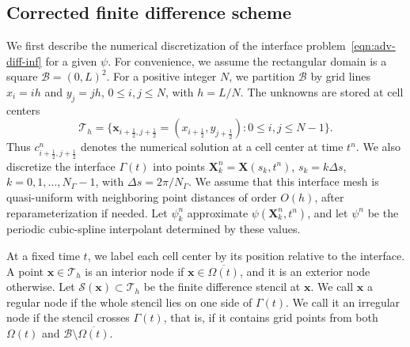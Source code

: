 \documentclass[11pt,reqno]{amsart}
\theoremstyle{plain}
\theoremstyle{definition}
\numberwithin{equation}{section}
\newcommand{\mc}[1]{\mathcal{#1}}
\newcommand{\bm}[1]{\boldsymbol{#1}}
\begin{document}
\subsection{Corrected finite difference scheme}
We first describe the numerical discretization of the interface problem~\eqref{eqn:adv-diff-inf} for a given $\psi$.
For convenience, we assume the rectangular domain is a square $\mc B = (0,L)^2$.
For a positive integer $N$, we partition $\mc B$ by grid lines
$x_i=i h$ and $y_j=j h$, $0\le i,j\le N$, with $h=L/N$. The unknowns are stored
at cell centers
\begin{equation}
\mc T_h=\{\bm x_{i+\frac12,j+\frac12}
=(x_{i+\frac12},y_{j+\frac12}) : 0\le i,j\le N-1\}.
\end{equation}
Thus $c_{i+\frac12,j+\frac12}^n$ denotes the numerical solution at a cell
center at time $t^n$. We also discretize the interface $\Gamma(t)$ into points
$\bm X_k^n=\bm X(s_k,t^n)$, $s_k=k\Delta s$, $k=0,1,\ldots,N_\Gamma-1$, with
$\Delta s=2\pi/N_\Gamma$. We assume that this interface mesh is quasi-uniform with
neighboring point distances of order $O(h)$, after reparameterization if
needed. Let $\psi_k^n$ approximate $\psi(\bm X_k^n,t^n)$, and let $\psi^n$ be
the periodic cubic-spline interpolant determined by these values.



At a fixed time $t$, we label each cell center by its position relative to the interface. A point $\bm x\in\mc T_h$ is an interior node if $\bm x\in\overline{\Omega(t)}$, and it is an exterior node otherwise.
Let $\mathcal{S}(\bm x)\subset\mc T_h$ be the finite difference stencil at $\bm x$. We call $\bm x$ a regular node if the whole stencil lies on one side of $\Gamma(t)$. We call it an irregular node if the stencil crosses $\Gamma(t)$, that is, if it contains grid points from both $\Omega(t)$ and $\mc B\setminus\overline{\Omega(t)}$.
\end{document}
